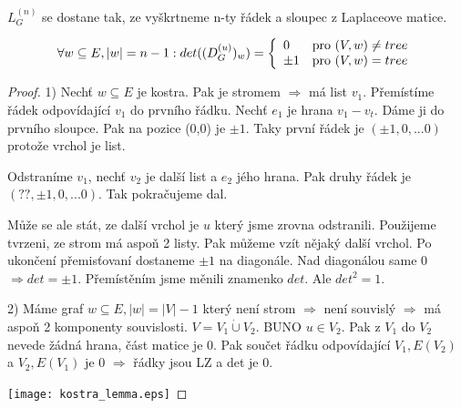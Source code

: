 \begin{definition}
	$ L^{(n)}_G $ se dostane tak, ze vyškrtneme n-ty řádek a sloupec z Laplaceove matice.
\end{definition}
\begin{lemma}
\[ \forall w \subseteq E, |w| = n - 1: det((D^{(u)}_G)_w) = \left\{ \begin{array}{ll} 0 & \mbox{pro } (V, w) \neq tree \\ \pm 1 & \mbox{pro }  (V,w) = tree \end{array} \right.  \]
\end{lemma}
\begin{proof}
		1) Nechť $w \subseteq E$ je kostra. Pak je stromem $\Rightarrow$ má list $v_1$. Přemístíme řádek odpovídající $v_1$ do prvního řádku. Nechť $e_1$ je hrana $v_1 - v_t$. Dáme ji do prvního sloupce.
		Pak na pozice (0,0) je $\pm 1$. Taky první řádek je $(\pm 1, 0, ... 0)$ protože vrchol je list.

	Odstraníme $v_1$, nechť $v_2$ je další list a $e_2$ jého hrana. Pak druhy řádek je $(??, \pm 1, 0, ... 0)$. Tak pokračujeme dal.

	Může se ale stát, ze další vrchol je $u$ který jsme zrovna odstranili. Použijeme tvrzeni, ze strom má aspoň 2 listy. Pak můžeme vzít nějaký další vrchol. Po ukončení přemisťovaní dostaneme $\pm 1$ na diagonále. Nad diagonálou same 0 $\Rightarrow det = \pm 1$. Přemístěním jsme měnili znamenko $det$. Ale $det^2 = 1$.

	2) Máme graf $w \subseteq E, |w| = |V| - 1$ který není strom $\Rightarrow$ není souvislý $\Rightarrow$ má aspoň 2 komponenty souvislosti. $V = V_1 \mathbin{\dot{\cup}} V_2$.
	BUNO $u \in V_2$. Pak z $V_1$ do $V_2$ nevede žádná hrana, část matice je 0. Pak součet řádku odpovídající $V_1, E(V_2)$ a $V_2, E(V_1)$ je 0 $\Rightarrow$ řádky jsou LZ a det je 0.

	\texttt{[image: kostra\_lemma.eps]}
\end{proof}

